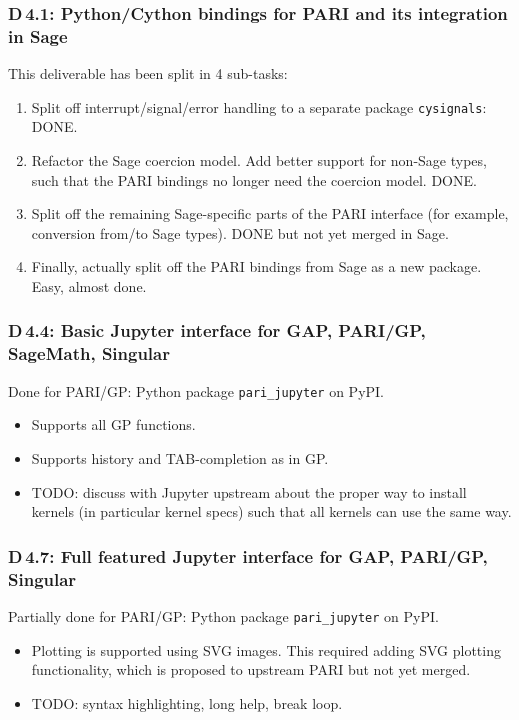 \documentclass{beamer}
\begin{document}
\begin{frame}
\frametitle{D\,4.1: Python/Cython bindings for PARI and its integration in Sage}
This deliverable has been split in 4 sub-tasks:
\begin{enumerate}
\item Split off interrupt/signal/error handling to a separate package \texttt{cysignals}:
DONE.

\item Refactor the Sage coercion model. Add better support for non-Sage types,
such that the PARI bindings no longer need the coercion model.
DONE.

\item Split off the remaining Sage-specific parts of the PARI interface
(for example, conversion from/to Sage types).
DONE but not yet merged in Sage.

\item Finally, actually split off the PARI bindings from Sage as a new package.
Easy, almost done.
\end{enumerate}
\end{frame}

\begin{frame}
\frametitle{D\,4.4: Basic Jupyter interface for GAP, PARI/GP, SageMath, Singular}

Done for PARI/GP: Python package \texttt{pari\_jupyter} on PyPI.

\begin{itemize}
\item Supports all GP functions.

\item Supports history and TAB-completion as in GP.

\item TODO: discuss with Jupyter upstream about the proper way to
install kernels (in particular kernel specs)
such that all kernels can use the same way.
\end{itemize}
\end{frame}

\begin{frame}
\frametitle{D\,4.7: Full featured Jupyter interface for GAP, PARI/GP, Singular}

Partially done for PARI/GP: Python package \texttt{pari\_jupyter} on PyPI.

\begin{itemize}
\item Plotting is supported using SVG images. This required adding SVG plotting
functionality, which is proposed to upstream PARI but not yet merged.

\item TODO: syntax highlighting, long help, break loop.
\end{itemize}
\end{frame}
\end{document}
